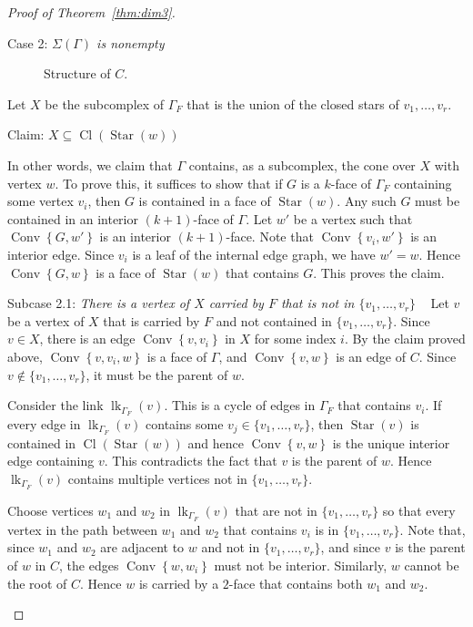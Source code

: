 \documentclass[ALCO,ThmDefs,Unicode,epreuves]{cedram}
\DeclareMathOperator{\Cl}{Cl}
\DeclareMathOperator{\Convop}{Conv}
\newcommand{\Conv}[1]{\Convop\left\{{#1}\right\}}
\DeclareMathOperator{\lk}{lk}
\DeclareMathOperator{\Star}{Star}
\newenvironment{proofsection}[2]{\begin{enonce*}[remark]{#1 \emph{#2}} \ }{\end{enonce*}}
\begin{document}
\begin{proof}[Proof of Theorem~\ref{thm:dim3}]
\begin{proofsection}{Case 2:}{$\Sigma(\Gamma)$ is nonempty}
\begin{figure}[htb]
\vspace*{-2mm}
\caption{Structure of $C$.}
\label{fig:possible-sigma}
\end{figure}

Let $X$ be the subcomplex of $\Gamma_F$ that is the union of the closed stars of $v_1, \ldots, v_r$. 
\end{proofsection}

\goodbreak
\begin{proofsection}{Claim:} {$X \subseteq \Cl(\Star(w))$}

In other words, we claim that $\Gamma$ contains, as a subcomplex, the cone over $X$ with vertex $w$. To prove this, it suffices to show that if $G$ is a $k$-face of $\Gamma_F$ containing some vertex $v_i$, then $G$ is contained in a face of $\Star(w)$. Any such $G$ must be contained in an interior $(k+1)$-face of $\Gamma$. Let $w'$ be a vertex such that $\Conv{G,w'}$ is an interior $(k+1)$-face. Note that $\Conv{v_i,w'}$ is an interior edge. Since $v_i$ is a leaf of the internal edge graph, we have $w'=w$. Hence $\Conv{G,w}$ is a face of $\Star(w)$ that contains $G$. This proves the claim.
\end{proofsection}

\begin{proofsection}{Subcase 2.1:} {There is a vertex of $X$ carried by $F$ that is not in $\{ v_1, \ldots, v_r \}$}
Let $v$ be a vertex of $X$ that is carried by $F$ and not contained in $\{v_1, \ldots, v_r\}$. Since $v\in X$, there is an edge $\Conv{v,v_i}$ in $X$ for some index $i$. By the claim proved above, $\Conv{v,v_i,w}$ is a face of $\Gamma$, and $\Conv{v,w}$ is an edge of $C$. Since $v \not \in \{v_1, \ldots, v_r\}$, it must be the parent of $w$. 

Consider the link $\lk_{\Gamma_F}(v)$. This is a cycle of edges in $\Gamma_F$ that contains $v_i$. If every edge in $\lk_{\Gamma_F}(v)$ contains some $v_j \in \{ v_1, \ldots, v_r \}$, then $\Star(v)$ is contained in $\Cl(\Star(w))$ and hence $\Conv{v,w}$ is the unique interior edge containing $v$. This contradicts the fact that $v$ is the parent of $w$. Hence $\lk_{\Gamma_F}(v)$ contains multiple vertices not in $\{v_1, \ldots, v_r \}$.

Choose vertices $w_1$ and $w_2$ in $\lk_{\Gamma_F}(v)$ that are not in $\{v_1, \ldots, v_r\}$ so that every vertex in the path between $w_1$ and $w_2$ that contains $v_i$ is in $\{v_1, \ldots, v_r\}$. Note that, since $w_1$ and $w_2$ are adjacent to $w$ and not in $\{v_1, \ldots, v_r \}$, and since $v$ is the parent of $w$ in $C$, the edges $\Conv{w,w_i}$ must not be interior. Similarly, $w$ cannot be the root of $C$. Hence $w$ is carried by a $2$-face that contains both $w_1$ and $w_2$. 


\end{proofsection}
\end{proof}
\end{document}
